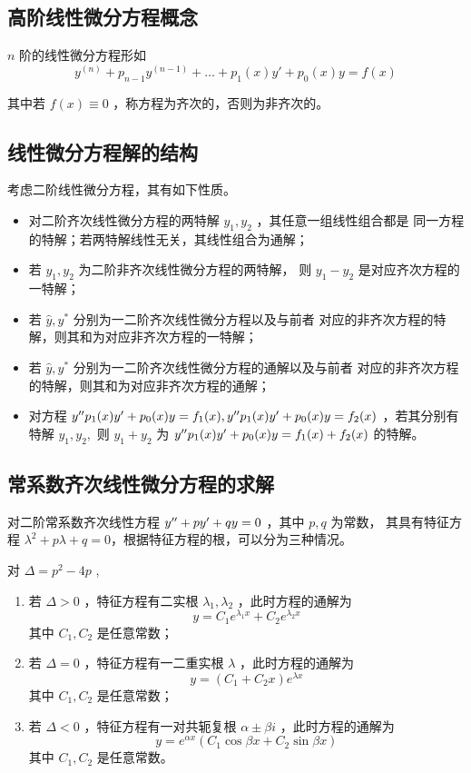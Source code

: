 \subsection{高阶线性微分方程概念}

$ n $ 阶的线性微分方程形如$$
    y^{(n)}+p_{n-1}y^{(n-1)} + \dots + p_1(x)y'+p_0(x)y = f(x)
$$ 

其中若 $ f(x)\equiv 0 $ ，称方程为齐次的，否则为非齐次的。

\subsection{线性微分方程解的结构}

考虑二阶线性微分方程，其有如下性质。

\begin{itemize}
    \item 对二阶齐次线性微分方程的两特解 $ y_1,y_2 $ ，其任意一组线性组合都是
    同一方程的特解；若两特解线性无关，其线性组合为通解；
    \item 若 $ y_1,y_2 $ 为二阶非齐次线性微分方程的两特解，
    则 $ y_1-y_2 $ 是对应齐次方程的一特解；
    \item 若 $ \hat y,y^* $ 分别为一二阶齐次线性微分方程以及与前者
    对应的非齐次方程的特解，则其和为对应非齐次方程的一特解；
    \item 若 $ \hat y,y^* $ 分别为一二阶齐次线性微分方程的通解以及与前者
    对应的非齐次方程的特解，则其和为对应非齐次方程的通解；
    \item 对方程 $ y^{\prime\prime} p_1(x)y'+p_0(x)y = f_1(x),y^{\prime\prime} p_1(x)y'+p_0(x)y = f_2(x) $
    ，若其分别有特解 $ y_1,y_2, $ 则 $ y_1+y_2 $ 为 $ y^{\prime\prime} p_1(x)y'+p_0(x)y = f_1(x)+f_2(x) $ 的特解。
\end{itemize}

\subsection{常系数齐次线性微分方程的求解}

对二阶常系数齐次线性方程 $ y^{\prime\prime} +py'+qy = 0 $ ，其中 $ p,q $ 为常数，
其具有特征方程 $ \lambda^2+p\lambda+q = 0 $，根据特征方程的根，可以分为三种情况。

对 $ \Delta = p^2 - 4p $ ,
\begin{enumerate}
    \item 若 $ \Delta > 0 $ ，特征方程有二实根 $ \lambda_1,\lambda_2 $ ，此时方程的通解为$$
        y = C_1e^{\lambda_1x}+C_2e^{\lambda_2x}
    $$ 其中 $ C_1,C_2 $ 是任意常数；
    \item 若 $ \Delta = 0 $ ，特征方程有一二重实根 $ \lambda $ ，此时方程的通解为$$
        y = (C_1+C_2 x)e^{\lambda x}
    $$ 其中 $ C_1,C_2 $ 是任意常数；
    \item 若 $ \Delta < 0 $ ，特征方程有一对共轭复根 $ \alpha\pm\beta i $ ，此时方程的通解为$$
        y = e^{\alpha x}\left(C_1\cos \beta x + C_2 \sin \beta x\right)
    $$ 其中 $ C_1,C_2 $ 是任意常数。
\end{enumerate}

